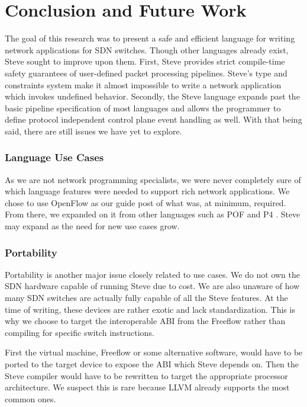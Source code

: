\chapter{ Conclusion and Future Work} \label{ch:conclusion}

The goal of this research was to present a safe and efficient language for writing network applications for SDN switches. Though other languages already exist, Steve sought to improve upon them. First, Steve provides strict compile-time safety guarantees of user-defined packet processing pipelines.
Steve's type and constraints system make it almost impossible to write a network application which invokes undefined behavior.
Secondly, the Steve language expands past the basic pipeline specification of most languages and allows the programmer to define protocol independent control plane event handling as well.
With that being said, there are still issues we have yet to explore.

\subsection{Language Use Cases}

As we are not network programming specialists, we were never completely sure of which language features were needed to support rich network applications. We chose to use OpenFlow \cite{openflow_spec} as our guide post of what was, at minimum, required. From there, we expanded on it from other languages such as POF \cite{pof, pof_fis, pof_impl} and P4 \cite{pof, p42014, p4_spec}. Steve may expand as the need for new use cases grow.

\subsection{Portability}

Portability is another major issue closely related to use cases. We do not own the SDN hardware capable of running Steve due to cost. We are also unaware of how many SDN switches are actually fully capable of all the Steve features. At the time of writing, these devices are rather exotic and lack standardization. This is why we choose to target the interoperable ABI from the Freeflow rather than compiling for specific switch instructions.

First the virtual machine, Freeflow \cite{freeflow_software} or some alternative software, would have to be ported to the target device to expose the ABI which Steve depends on. Then the Steve compiler would have to be rewritten to target the appropriate processor architecture. We suspect this is rare because LLVM already supports the most common ones.

